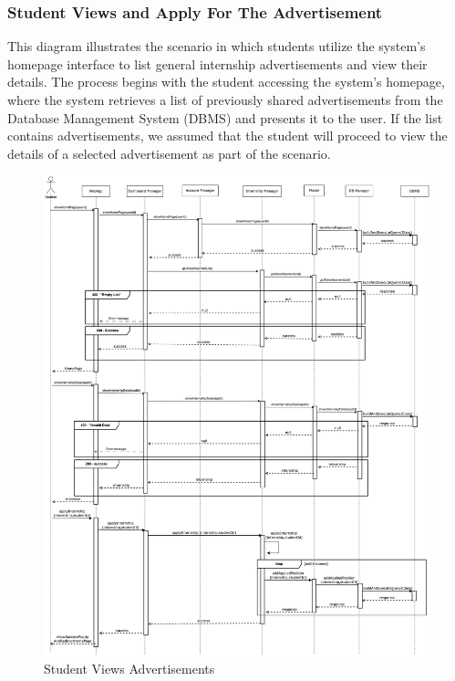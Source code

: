 \documentclass[a4paper,12pt]{article}
\begin{document}
\subsubsection*{ Student Views and Apply For The Advertisement} 
This diagram illustrates the scenario in which students utilize the system’s homepage interface to list general internship advertisements and view their details. The process begins with the student accessing the system’s homepage, where the system retrieves a list of previously shared advertisements from the Database Management System (DBMS) and presents it to the user. If the list contains advertisements, we assumed that the student will proceed to view the details of a selected advertisement as part of the scenario. 
\begin{figure}[H]
    \centering
    \includegraphics[scale = 0.25]{DD_figures/RuntimeView/studentViewInternship.drawio.png}
    \caption{Student Views Advertisements}
    \centering
\end{figure}
\newpage
\end{document}
